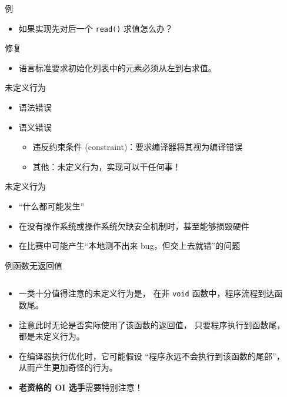 \documentclass[10pt,mathserif]{beamer}
\newcommand{\lstcode}[1] {  }
\begin{document}
\begin{frame}{例}
	\lstcode{unspecified.cc}
	\begin{itemize}
		\item 如果实现先对后一个 \lstinline{read()} 求值怎么办？
	\end{itemize}
\end{frame}

\begin{frame}{修复}
	\lstcode{unspecified-fix.cc}
	\begin{itemize}
		\item 语言标准要求初始化列表中的元素必须从左到右求值。
	\end{itemize}
\end{frame}

\begin{frame}{未定义行为}
	\begin{itemize}
		\item 语法错误
		\item 语义错误
			\begin{itemize}
				\item 违反约束条件 (constraint)：要求编译器将其视为编译错误
				\item 其他：未定义行为，实现可以干任何事！
			\end{itemize}
	\end{itemize}
\end{frame}

\begin{frame}{未定义行为}
	\begin{itemize}
		\item “什么都可能发生”
		\item 在没有操作系统或操作系统欠缺安全机制时，甚至能够损毁硬件
		\item 在比赛中可能产生“本地测不出来 bug，但交上去就错”的问题
	\end{itemize}
\end{frame}

\begin{frame}{例}{函数无返回值}
	\begin{columns}[t]
		\begin{column}{.5\textwidth}
			\begin{itemize}
				\item 一类十分值得注意的未定义行为是，
					在非 \lstinline{void} 函数中，程序流程到达函数尾。
				\item 注意此时无论是否实际使用了该函数的返回值，
					只要程序执行到函数尾，都是未定义行为。
				\item 在编译器执行优化时，它可能假设
					“程序永远不会执行到该函数的尾部”，
					从而产生更加奇怪的行为。
				\item \textbf{老资格的 OI 选手}需要特别注意！
			\end{itemize}
		\end{column}
		\begin{column}{.5\textwidth}
			\lstcode{no-return.cc}
		\end{column}
	\end{columns}
\end{frame}
\end{document}
